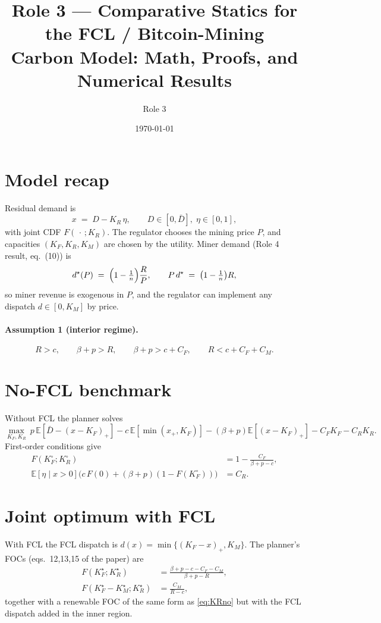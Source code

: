 \documentclass[11pt]{article}
\title{Role 3 --- Comparative Statics for the FCL / Bitcoin-Mining\\
Carbon Model: Math, Proofs, and Numerical Results}
\author{Role 3}
\date{\today}
\theoremstyle{definition}
\begin{document}
\maketitle

\section{Model recap}
Residual demand is
\[
x \;=\; D - K_R\,\eta, \qquad D\in[0,\bar D],\; \eta\in[0,1],
\]
with joint CDF $F(\,\cdot\,;K_R)$. The regulator chooses the mining price $P$, and capacities $(K_F,K_R,K_M)$ are chosen by the utility. Miner demand (Role 4 result, eq.~(10)) is
\begin{equation}
d^{\star}(P) \;=\; \Bigl(1-\tfrac{1}{n}\Bigr)\frac{R}{P},
\qquad P\,d^{\star} \;=\; \bigl(1-\tfrac{1}{n}\bigr)R,
\label{eq:miner}
\end{equation}
so miner revenue is exogenous in $P$, and the regulator can implement any dispatch $d\in[0,K_M]$ by price.

\paragraph{Assumption 1 (interior regime).}
\[
R>c,\qquad \beta+p>R,\qquad \beta+p>c+C_F,\qquad R<c+C_F+C_M.
\]

\section{No-FCL benchmark}
Without FCL the planner solves
\[
\max_{K_F,K_R}\ p\,\mathbb E[\bar D-(x-K_F)_+]
-c\,\mathbb E[\min(x_+,K_F)]
-(\beta+p)\mathbb E[(x-K_F)_+]
-C_F K_F-C_R K_R.
\]
First-order conditions give
\begin{align}
F(K_F^{\circ};K_R^{\circ}) &= 1-\frac{C_F}{\beta+p-c}, \label{eq:KFno}\\
\mathbb E[\eta\mid x>0]\bigl(c\,F(0)+(\beta+p)(1-F(K_F^{\circ}))\bigr) &=C_R. \label{eq:KRno}
\end{align}

\section{Joint optimum with FCL}
With FCL the FCL dispatch is $d(x)=\min\{(K_F-x)_+,K_M\}$. The planner's FOCs (eqs.~12,13,15 of the paper) are
\begin{align}
F(K_F^{\star};K_R^{\star}) &= \frac{\beta+p-c-C_F-C_M}{\beta+p-R}, \label{eq:KF}\\
F(K_F^{\star}-K_M^{\star};K_R^{\star}) &= \frac{C_M}{R-c}, \label{eq:KM}
\end{align}
together with a renewable FOC of the same form as \eqref{eq:KRno} but with the FCL dispatch added in the inner region.
\end{document}
